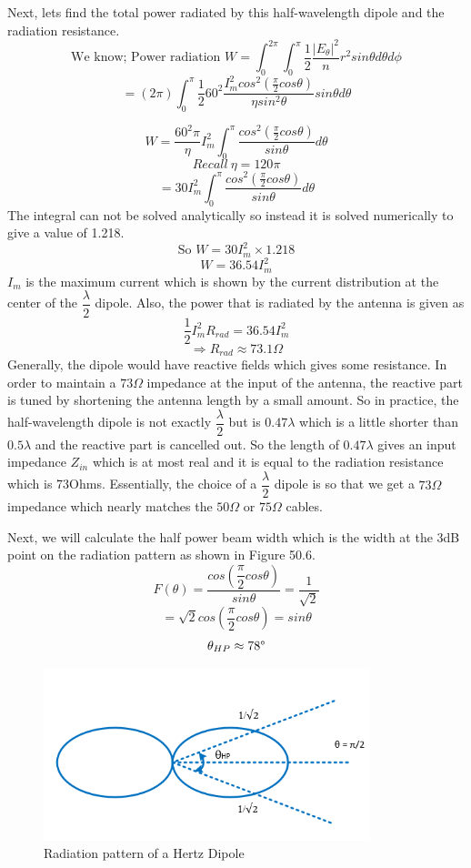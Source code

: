 Next, lets find the total power radiated by this half-wavelength dipole and the radiation resistance. 
\[ \text{We know; Power radiation } W = \int_0^{2\pi}\int_{0}^{\pi} \frac{1}{2}\frac{|E_\theta|^2}{n}r^2sin\theta d\theta d\phi \]
\[ = (2\pi)\int_{0}^{\pi} \frac{1}{2} 60^2 \frac{I_m^2cos^2(\frac{\pi}{2}cos\theta)}{\eta sin^2\theta}sin\theta d\theta \]

\[ W = \frac{60^2\pi}{\eta} I_m^2 \int_{0}^{\pi} \frac{cos^2(\frac{\pi}{2}cos\theta)}{sin\theta}d\theta \]
\[Recall\ \eta = 120\pi \]
\[ = 30I_m^2 \int_{0}^{\pi}\dfrac{cos^2(\frac{\pi}{2}cos\theta)}{sin\theta}d\theta \]
The integral can not be solved analytically so instead it is solved numerically to give a value of 1.218.
\[ \text{So } W = 30I_m^2 \times 1.218 \]
\begin{equation}
W = 36.54I_m^2
\end{equation}
$I_m$ is the maximum current which is shown by the current distribution at the center of the $\dfrac{\lambda}{2}$ dipole.
Also, the power that is radiated by the antenna is given as $$\dfrac{1}{2}I_m^2 R_{rad} = 36.54I_m^2$$
\[ \Rightarrow R_{rad} \approx 73.1\Omega \]
Generally, the dipole would have reactive fields which gives some resistance. In order to maintain a $73\Omega$ impedance at the input of the antenna, the reactive part is tuned by shortening the antenna length by a small amount. So in practice, the half-wavelength dipole is not exactly $\dfrac{\lambda}{2}$ but is $0.47\lambda$ which is a little shorter than $0.5\lambda$ and the reactive part is cancelled out. So the length of $0.47\lambda$ gives an input impedance $Z_{in}$ which is at most real and it is equal to the radiation resistance which is 73Ohms. Essentially, the choice of a $\dfrac{\lambda}{2}$ dipole is so that we get a $73\Omega$ impedance which nearly matches the $50\Omega$ or $75\Omega$ cables.

Next, we will calculate the half power beam width which is the width at the 3dB point on the radiation pattern as shown in Figure 50.6.
\[ F(\theta) = \dfrac{cos(\dfrac{\pi}{2}cos\theta)}{sin\theta} = \dfrac{1}{\sqrt{2}} \]
\[ = \sqrt{2}cos(\dfrac{\pi}{2}cos\theta) = sin\theta \]
\[ \theta_{HP} \approx 78\text{\textdegree} \]
\begin{figure}[h]
\centering
\includegraphics[height=5cm]{./graphics/image53_5}
\caption{Radiation pattern of a Hertz Dipole}
\label{fig:fig5}
\end{figure}


